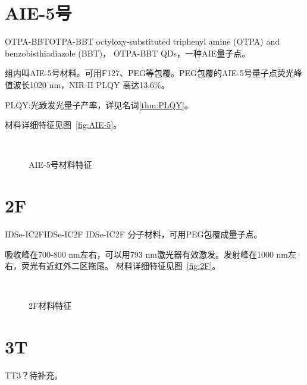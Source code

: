 \documentclass[cn,11pt,chinese]{elegantbook}
\begin{document}
\section{AIE-5号}
\begin{proposition}{OTPA-BBT}{OTPA-BBT}
  octyloxy‐substituted triphenyl amine (OTPA) and benzobisthiadiazole (BBT)，
OTPA-BBT QDs，一种AIE量子点。

组内叫AIE-5号材料。可用F127、PEG等包覆。PEG包覆的AIE-5号量子点荧光峰值波长1020 nm，NIR-II PLQY 高达13.6\%。
\end{proposition}

\begin{note}
  PLQY:光致发光量子产率，详见名词\vref{thm:PLQY}。
\end{note}
材料详细特征见图~\vref{fig:AIE-5}。
\begin{figure}[ht]
	\centering
	 \quad
	 \\
	 \quad
	\caption{AIE-5号材料特征} 
	\label{fig:AIE-5}
\end{figure}

\section{2F}
\begin{proposition}{IDSe-IC2F}{IDSe-IC2F}
  IDSe-IC2F 分子材料，可用PEG包覆成量子点。
  
  吸收峰在700-800 nm左右，可以用793 nm激光器有效激发。发射峰在1000 nm左右，荧光有近红外二区拖尾。
  材料详细特征见图~\vref{fig:2F}。
\end{proposition}

\begin{figure}[ht]
	\centering
	 \\
	 \quad
	\caption{2F材料特征} 
	\label{fig:2F}
\end{figure}

\section{3T}
TT3？待补充。
\end{document}
